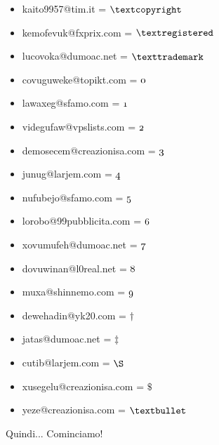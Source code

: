 \documentclass[12pt, a4paper] {article} %
\begin{document}
\begin{itemize}
		\item kaito9957@tim.it = $\textcopyright$ \\
		\item kemofevuk@fxprix.com = $\textregistered$ \\
		\item lucovoka@dumoac.net = $\texttrademark$ \\
		\item covuguweke@topikt.com = $\oldstylenums{0}$ \\
		\item lawaxeg@sfamo.com = $\oldstylenums{1}$ \\
		\item videgufaw@vpslists.com = $\oldstylenums{2}$ \\
		\item demosecem@creazionisa.com = $\oldstylenums{3}$ \\
		\item junug@larjem.com = $\oldstylenums{4}$ \\
		\item nufubejo@sfamo.com = $\oldstylenums{5}$ \\
		\item lorobo@99pubblicita.com = $\oldstylenums{6}$ \\
		\item xovumufeh@dumoac.net = $\oldstylenums{7}$ \\
		\item dovuwinan@l0real.net = $\oldstylenums{8}$ \\
		\item muxa@shinnemo.com = $\oldstylenums{9}$ \\
		\item dewehadin@yk20.com = $\dag$ \\
		\item jatas@dumoac.net = $\ddag$ \\
		\item cutib@larjem.com = $\S$ \\
		\item xusegelu@creazionisa.com = $\$$ \\
		\item yeze@creazionisa.com = $\textbullet$ \\
		
		
		
		
				
	\end{itemize}
	
	Quindi... Cominciamo!
	\newpage
	\tableofcontents
	
\end{document}
